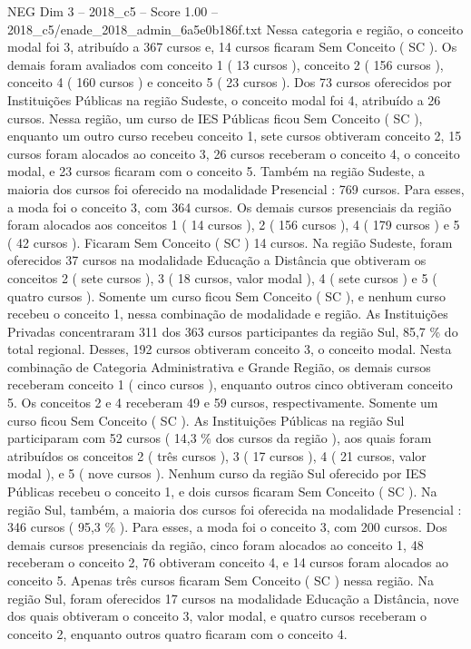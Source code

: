\begin{textsample}{NEG Dim 3 – 2018\_c5 – Score 1.00 – 2018\_c5/enade\_2018\_admin\_6a5e0b186f.txt}
Nessa categoria e região, o conceito modal foi 3, atribuído a 367 cursos e, 14 cursos ficaram Sem Conceito ( SC ).
Os demais foram avaliados com conceito 1 ( 13 cursos ), conceito 2 ( 156 cursos ), conceito 4 ( 160 cursos ) e conceito 5 ( 23 cursos ).
Dos 73 cursos oferecidos por Instituições Públicas na região Sudeste, o conceito modal foi 4, atribuído a 26 cursos.
Nessa região, um curso de IES Públicas ficou Sem Conceito ( SC ), enquanto um outro curso recebeu conceito 1, sete cursos obtiveram conceito 2, 15 cursos foram alocados ao conceito 3, 26 cursos receberam o conceito 4, o conceito modal, e 23 cursos ficaram com o conceito 5.
Também na região Sudeste, a maioria dos cursos foi oferecido na modalidade Presencial : 769 cursos.
Para esses, a moda foi o conceito 3, com 364 cursos.
Os demais cursos presenciais da região foram alocados aos conceitos 1 ( 14 cursos ), 2 ( 156 cursos ), 4 ( 179 cursos ) e 5 ( 42 cursos ).
Ficaram Sem Conceito ( SC ) 14 cursos.
Na região Sudeste, foram oferecidos 37 cursos na modalidade Educação a Distância que obtiveram os conceitos 2 ( sete cursos ), 3 ( 18 cursos, valor modal ), 4 ( sete cursos ) e 5 ( quatro cursos ).
Somente um curso ficou Sem Conceito ( SC ), e nenhum curso recebeu o conceito 1, nessa combinação de modalidade e região.
As Instituições Privadas concentraram 311 dos 363 cursos participantes da região Sul, 85,7 \% do total regional.
Desses, 192 cursos obtiveram conceito 3, o conceito modal.
Nesta combinação de Categoria Administrativa e Grande Região, os demais cursos receberam conceito 1 ( cinco cursos ), enquanto outros cinco obtiveram conceito 5.
Os conceitos 2 e 4 receberam 49 e 59 cursos, respectivamente.
Somente um curso ficou Sem Conceito ( SC ).
As Instituições Públicas na região Sul participaram com 52 cursos ( 14,3 \% dos cursos da região ), aos quais foram atribuídos os conceitos 2 ( três cursos ), 3 ( 17 cursos ), 4 ( 21 cursos, valor modal ), e 5 ( nove cursos ).
Nenhum curso da região Sul oferecido por IES Públicas recebeu o conceito 1, e dois cursos ficaram Sem Conceito ( SC ).
Na região Sul, também, a maioria dos cursos foi oferecida na modalidade Presencial : 346 cursos ( 95,3 \% ).
Para esses, a moda foi o conceito 3, com 200 cursos.
Dos demais cursos presenciais da região, cinco foram alocados ao conceito 1, 48 receberam o conceito 2, 76 obtiveram conceito 4, e 14 cursos foram alocados ao conceito 5.
Apenas três cursos ficaram Sem Conceito ( SC ) nessa região.
Na região Sul, foram oferecidos 17 cursos na modalidade Educação a Distância, nove dos quais obtiveram o conceito 3, valor modal, e quatro cursos receberam o conceito 2, enquanto outros quatro ficaram com o conceito 4.

\end{textsample}
